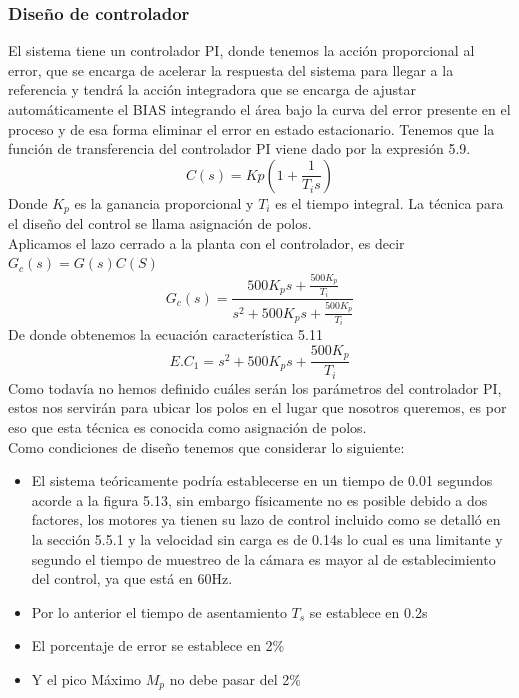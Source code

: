 \subsubsection{Diseño de controlador}
El sistema tiene un controlador PI, donde tenemos la acción proporcional al error, que se encarga de acelerar la respuesta del sistema para llegar a la referencia
y tendrá la acción integradora que se encarga de ajustar automáticamente el BIAS integrando el área bajo la curva del error presente en el proceso y de esa forma
eliminar el error en estado estacionario. Tenemos que la función de transferencia del controlador PI viene dado por la expresión 5.9.
\begin{equation}
	C(s) = Kp(1 + \frac{1}{T_is})
\end{equation}
Donde $K_p$ es la ganancia proporcional y $T_i$ es el tiempo integral. La técnica para el diseño del control se llama asignación de polos.\\
Aplicamos el lazo cerrado a la planta con el controlador, es decir $G_c(s) = G(s)C(S)$
\begin{equation}
	G_c(s) = \frac{500K_ps + \frac{500K_p}{T_i}}{s^2 + 500K_ps + \frac{500K_p}{T_i}}
\end{equation}
De donde obtenemos la ecuación característica 5.11
\begin{equation}
	E.C_1 = s^2 + 500K_ps + \frac{500K_p}{T_i}
\end{equation}
Como todavía no hemos definido cuáles serán los parámetros del controlador PI, estos nos servirán para ubicar los polos en el lugar que nosotros queremos, es por
eso que esta técnica es conocida como asignación de polos.\\
Como condiciones de diseño tenemos que considerar lo siguiente:
\begin{itemize}
	\item El sistema teóricamente podría establecerse en un tiempo de 0.01 segundos acorde a la figura 5.13, sin embargo físicamente no es posible debido a dos
		factores, los motores ya tienen su lazo de control incluido como se detalló en la sección 5.5.1 y la velocidad sin carga es de 0.14s lo cual es una
		limitante y segundo el tiempo de muestreo de la cámara es mayor al de establecimiento del control, ya que está en 60Hz.
	\item Por lo anterior el tiempo de asentamiento $T_s$ se establece en 0.2s 
	\item El porcentaje de error se establece en 2\%
	\item Y el pico Máximo $M_p$ no debe pasar del 2\%
\end{itemize}
